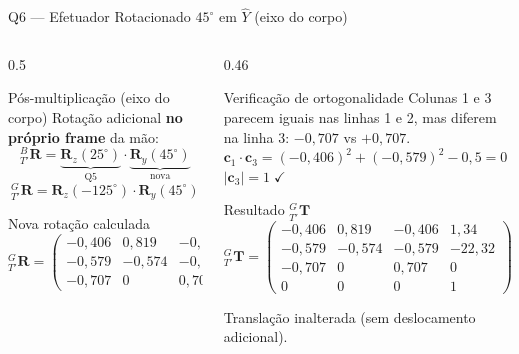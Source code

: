\documentclass[aspectratio=169,12pt]{beamer}
\newcommand{\Ry}[1]{\mathbf{R}_y(#1)}
\newcommand{\Rz}[1]{\mathbf{R}_z(#1)}
\newcommand{\Rot}[2]{{}^{#1}_{#2}\!\mathbf{R}}
\newcommand{\Trans}[2]{{}^{#1}_{#2}\!\mathbf{T}}
\newcommand{\degr}{^{\circ}}
\newcommand{\mat}[1]{\begin{pmatrix}#1\end{pmatrix}}
\begin{document}
\begin{frame}{Q6 --- Efetuador Rotacionado $45\degr$ em $\hat{Y}$ (eixo do corpo)}
  \begin{columns}
    \begin{column}{0.5\textwidth}
      \begin{block}{Pós-multiplicação (eixo do corpo)}
        Rotação adicional \textbf{no próprio frame} da mão:
        \[
          \Rot{B}{T'} = \underbrace{\Rz{25\degr}}_{\text{Q5}} \cdot \underbrace{\Ry{45\degr}}_{\text{nova}}
        \]
        \[
          \Rot{G}{T'} = \Rz{-125\degr}\cdot\Ry{45\degr}
        \]
      \end{block}
      \begin{block}{Nova rotação calculada}
        \tiny
        \[
          \Rot{G}{T'}=\mat{
            -0{,}406 & 0{,}819 & -0{,}406\\
            -0{,}579 &-0{,}574 & -0{,}579\\
            -0{,}707 & 0       &  0{,}707}
        \]
      \end{block}
    \end{column}
    \begin{column}{0.46\textwidth}
      \begin{block}{Verificação de ortogonalidade}
        \small
        Colunas 1 e 3 parecem iguais nas linhas 1 e 2, mas diferem na linha 3: $-0{,}707$ vs $+0{,}707$.\\[4pt]
        $\mathbf{c}_1 \cdot \mathbf{c}_3 = (-0{,}406)^2+(-0{,}579)^2-0{,}5 = 0\;\checkmark$\\
        $|\mathbf{c}_3| = 1\;\checkmark$
      \end{block}
      \begin{exampleblock}{Resultado ${}^{G}_{T'}\mathbf{T}$}
        \tiny
        $\Trans{G}{T'}=\mat{
          -0{,}406 & 0{,}819 & -0{,}406 & 1{,}34\\
          -0{,}579 &-0{,}574 & -0{,}579 &-22{,}32\\
          -0{,}707 & 0       &  0{,}707 & 0\\
           0       & 0       &  0       & 1}$

        \small Translação inalterada (sem deslocamento adicional).
      \end{exampleblock}
    \end{column}
  \end{columns}
\end{frame}

\end{document}
